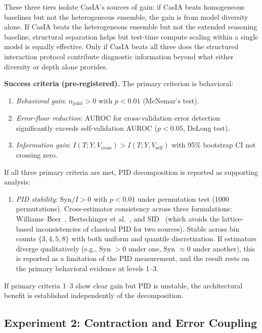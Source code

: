 \documentclass[11pt,a4paper]{article}
\theoremstyle{definition}
\begin{document}
These three tiers isolate CasIA's sources of gain: if CasIA beats homogeneous baselines but not the heterogeneous ensemble, the gain is from model diversity alone. If CasIA beats the heterogeneous ensemble but not the extended reasoning baseline, structural separation helps but test-time compute scaling within a single model is equally effective. Only if CasIA beats all three does the structured interaction protocol contribute diagnostic information beyond what either diversity or depth alone provides.

\textbf{Success criteria (pre-registered).} The primary criterion is behavioral:
\begin{enumerate}[leftmargin=*,itemsep=2pt]
\item \emph{Behavioral gain}: $n_\text{joint} > 0$ with $p < 0.01$ (McNemar's test).
\item \emph{Error-floor reduction}: AUROC for cross-validation error detection significantly exceeds self-validation AUROC ($p < 0.05$, DeLong test).
\item \emph{Information gain}: $I(T; Y, V_\text{cross}) > I(T; Y, V_\text{self})$ with 95\% bootstrap CI not crossing zero.
\end{enumerate}
If all three primary criteria are met, PID decomposition is reported as supporting analysis:
\begin{enumerate}[leftmargin=*,itemsep=2pt,start=4]
\item \emph{PID stability}: $\mathrm{Syn}/I > 0$ with $p < 0.01$ under permutation test (1000 permutations). Cross-estimator consistency across three formulations: Williams--Beer~\cite{williams2010pid}, Bertschinger et al.~\cite{bertschinger2014pid}, and SID~\cite{lyu2025multivariate} (which avoids the lattice-based inconsistencies of classical PID for two sources). Stable across bin counts $\{3,4,5,8\}$ with both uniform and quantile discretization. If estimators diverge qualitatively (e.g., Syn $>0$ under one, Syn $\approx 0$ under another), this is reported as a limitation of the PID measurement, and the result rests on the primary behavioral evidence at levels 1--3.
\end{enumerate}
If primary criteria 1--3 show clear gain but PID is unstable, the architectural benefit is established independently of the decomposition.


\subsection{Experiment 2: Contraction and Error Coupling}
\end{document}

